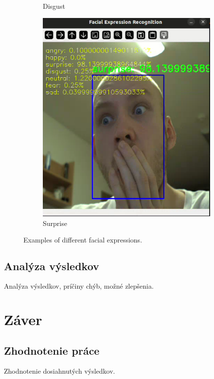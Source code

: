 \begin{figure}[!htpb]
\begin{subfigure}[b]{0.45\textwidth}
        \caption{Disgust}
        \label{fig:disgust}
    \end{subfigure}
    \hfill
    \begin{subfigure}[b]{0.45\textwidth}
        \centering
        \includegraphics[width=\textwidth]{img/surprise.png}
        \caption{Surprise}
        \label{fig:surprise}
    \end{subfigure}
    \caption{Examples of different facial expressions.}
    \label{fig:expressions}
\end{figure}
\newpage
\subsection{Analýza výsledkov} Analýza výsledkov, príčiny chýb, možné zlepšenia.


\section{Záver}
\subsection{Zhodnotenie práce}Zhodnotenie dosiahnutých výsledkov.

